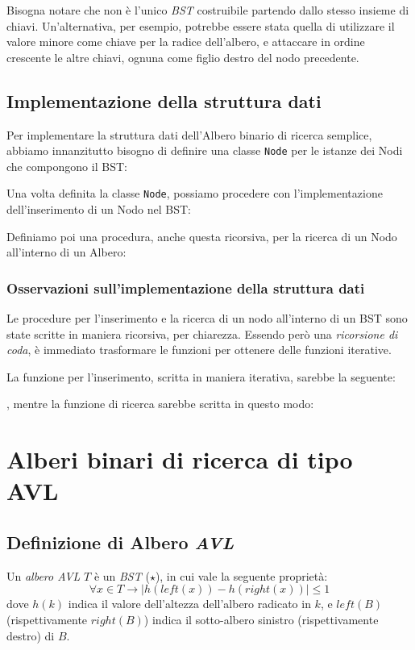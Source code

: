\documentclass[11pt,a4paper,italian]{article}
\begin{document}
Bisogna notare che non è l'unico \textit{BST} costruibile partendo dallo stesso insieme di chiavi. Un'alternativa, per esempio, potrebbe essere stata quella di utilizzare il valore minore come chiave per la radice dell'albero, e attaccare in ordine crescente le altre chiavi, ognuna come figlio destro del nodo precedente.

\subsection{Implementazione della struttura dati}
Per implementare la struttura dati dell'Albero binario di ricerca semplice, abbiamo innanzitutto bisogno di definire una classe \texttt{Node} per le istanze dei Nodi che compongono il BST:
 

Una volta definita la classe \texttt{Node}, possiamo procedere con l'implementazione dell'inserimento di un Nodo nel BST:


Definiamo poi una procedura, anche questa ricorsiva, per la ricerca di un Nodo all'interno di un Albero:


\subsubsection{Osservazioni sull'implementazione della struttura dati}
Le procedure per l'inserimento e la ricerca di un nodo all'interno di un BST sono state scritte in maniera ricorsiva, per chiarezza. Essendo però una \textit{ricorsione di coda}, è immediato trasformare le funzioni per ottenere delle funzioni iterative.

La funzione per l'inserimento, scritta in maniera iterativa, sarebbe la seguente:

, mentre la funzione di ricerca sarebbe scritta in questo modo:




\section{Alberi binari di ricerca di tipo AVL}

\subsection{Definizione di Albero \textit{AVL}}  
Un \textit{albero AVL} $T$ è un \textit{BST} ($\star$), in cui vale la seguente proprietà:
\begin{equation}
	\forall x \in T \rightarrow | h(left(x)) - h(right(x)) | \leq 1	 \tag{$\ast$}
\end{equation}
dove $h(k)$ indica il valore dell'altezza dell'albero radicato in $k$, e $left(B)$ (rispettivamente $right(B)$) indica il sotto-albero sinistro (rispettivamente destro) di $B$.
\\
\end{document}
